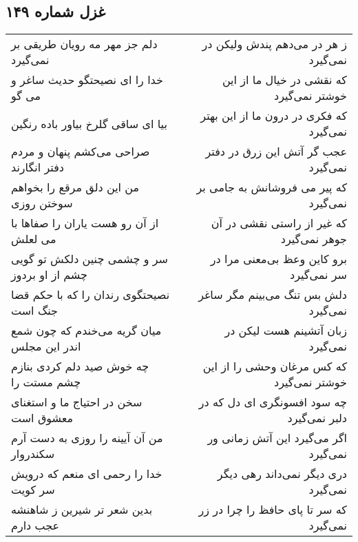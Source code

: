 \begin{center}
\section*{غزل شماره ۱۴۹}
\label{sec:sh149}
\begin{longtable}{l p{0.5cm} r}
دلم جز مهر مه رویان طریقی بر نمی‌گیرد
&&
ز هر در می‌دهم پندش ولیکن در نمی‌گیرد
\\
خدا را ای نصیحتگو حدیث ساغر و می گو
&&
که نقشی در خیال ما از این خوشتر نمی‌گیرد
\\
بیا ای ساقی گلرخ بیاور باده رنگین
&&
که فکری در درون ما از این بهتر نمی‌گیرد
\\
صراحی می‌کشم پنهان و مردم دفتر انگارند
&&
عجب گر آتش این زرق در دفتر نمی‌گیرد
\\
من این دلق مرقع را بخواهم سوختن روزی
&&
که پیر می فروشانش به جامی بر نمی‌گیرد
\\
از آن رو هست یاران را صفاها با می لعلش
&&
که غیر از راستی نقشی در آن جوهر نمی‌گیرد
\\
سر و چشمی چنین دلکش تو گویی چشم از او بردوز
&&
برو کاین وعظ بی‌معنی مرا در سر نمی‌گیرد
\\
نصیحتگوی رندان را که با حکم قضا جنگ است
&&
دلش بس تنگ می‌بینم مگر ساغر نمی‌گیرد
\\
میان گریه می‌خندم که چون شمع اندر این مجلس
&&
زبان آتشینم هست لیکن در نمی‌گیرد
\\
چه خوش صید دلم کردی بنازم چشم مستت را
&&
که کس مرغان وحشی را از این خوشتر نمی‌گیرد
\\
سخن در احتیاج ما و استغنای معشوق است
&&
چه سود افسونگری ای دل که در دلبر نمی‌گیرد
\\
من آن آیینه را روزی به دست آرم سکندروار
&&
اگر می‌گیرد این آتش زمانی ور نمی‌گیرد
\\
خدا را رحمی ای منعم که درویش سر کویت
&&
دری دیگر نمی‌داند رهی دیگر نمی‌گیرد
\\
بدین شعر تر شیرین ز شاهنشه عجب دارم
&&
که سر تا پای حافظ را چرا در زر نمی‌گیرد
\\
\end{longtable}
\end{center}
